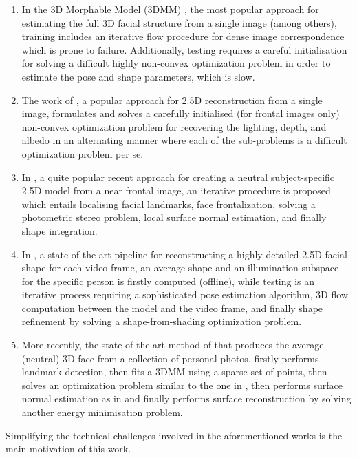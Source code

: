 \begin{enumerate}
\item In the 3D Morphable Model (3DMM) \cite{blanz1999morphable,
    romdhani2005estimating}, the most popular approach for estimating
  the full 3D facial structure from a single image (among others),
  training includes an iterative flow procedure for dense image
  correspondence which is prone to failure. Additionally, testing
  requires a careful initialisation for solving a difficult highly
  non-convex optimization problem in order to estimate the pose and
  shape parameters, which is slow.
\item The work of \cite{kemelmacher20113d}, a popular approach for
  2.5D reconstruction from a single image, formulates and solves a
  carefully initialised (for frontal images only) non-convex
  optimization problem for recovering the lighting, depth, and albedo
  in an alternating manner where each of the sub-problems is a
  difficult optimization problem per se.
\item In \cite{kemelmacher2011face}, a quite popular recent approach
  for creating a neutral subject-specific 2.5D model from a near
  frontal image, an iterative procedure is proposed which entails
  localising facial landmarks, face frontalization, solving a
  photometric stereo problem, local surface normal estimation, and
  finally shape integration.
\item In \cite{suwajanakorn2014total}, a state-of-the-art pipeline for
  reconstructing a highly detailed 2.5D facial shape for each video
  frame, an average shape and an illumination subspace for the
  specific person is firstly computed (offline), while testing is an
  iterative process requiring a sophisticated pose estimation
  algorithm, 3D flow computation between the model and the video
  frame, and finally shape refinement by solving a shape-from-shading
  optimization problem.
\item More recently, the state-of-the-art method of
  \cite{roth2016adaptive} that produces the average (neutral) 3D face
  from a collection of personal photos, firstly performs landmark
  detection, then fits a 3DMM using a sparse set of points, then
  solves an optimization problem similar to the one in
  \cite{kemelmacher2011face}, then performs surface normal estimation
  as in \cite{kemelmacher2011face} and finally performs surface
  reconstruction by solving another energy minimisation problem.
\end{enumerate}

Simplifying the technical challenges involved in the aforementioned
works is the main motivation of this work.

